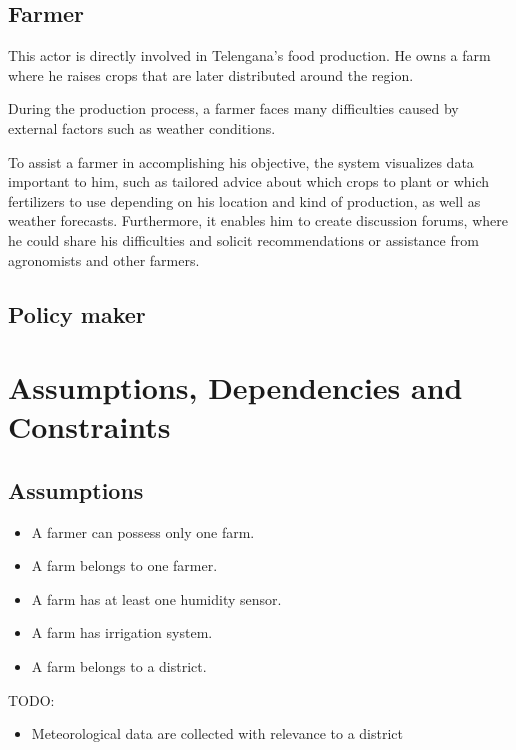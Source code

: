 \subsection{Farmer}

This actor is directly involved in Telengana's food production. He owns a farm where he raises crops that are later distributed around the region.

During the production process, a farmer faces many difficulties caused by external factors such as weather conditions.

To assist a farmer in accomplishing his objective, the system visualizes data important to him, such as tailored advice about which crops to plant or which fertilizers to use depending on his location and kind of production, as well as weather forecasts. Furthermore, it enables him to create discussion forums, where he could share his difficulties and solicit recommendations or assistance from agronomists and other farmers.

\subsection{Policy maker}




\section{Assumptions, Dependencies and Constraints}
\subsection{Assumptions}
\begin{itemize}
    \item A farmer can possess only one farm.
    \item A farm belongs to one farmer.
    \item A farm has at least one humidity sensor.
    \item A farm has irrigation system.
    \item A farm belongs to a district.
\end{itemize}
TODO:
\begin{itemize}
    \item Meteorological data are collected with relevance to a district
\end{itemize}